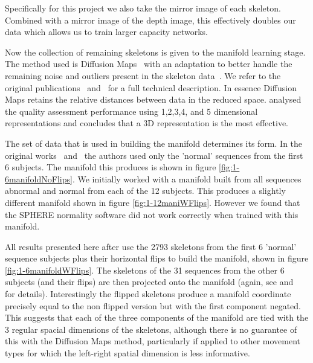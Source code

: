 \documentclass[11pt]{article} %
\begin{document}
Specifically for this project we also take the mirror image of each skeleton. Combined with a mirror image of the depth image, this effectively doubles our data which allows us to train larger capacity networks.

Now the collection of remaining skeletons is given to the manifold learning stage. The method used is Diffusion Maps~\cite{Coifman2006} with an adaptation to better handle the remaining noise and outliers present in the skeleton data~\cite{Paiement}. We refer to the original publications~\cite{Paiement} and~\cite{Tao} for a full technical description. In essence Diffusion Maps retains the relative distances between data in the reduced space. \cite{Tao} analysed the quality assessment performance using 1,2,3,4, and 5 dimensional representations and concludes that a 3D representation is the most effective.

The set of data that is used in building the manifold determines its form. In the original works~\cite{Paiement} and~\cite{Tao} the authors used only the 'normal' sequences from the first 6 subjects. The manifold this produces is shown in figure \ref{fig:1-6manifoldNoFlips}. We initially worked with a manifold built from all sequences abnormal and normal from each of the 12 subjects. This produces a slightly different manifold shown in figure \ref{fig:1-12maniWFlips}. However we found that the SPHERE normality software did not work correctly when trained with this manifold. %

All results presented here after use the 2793 skeletons from the first 6 'normal' sequence subjects plus their horizontal flips to build the manifold, shown in figure \ref{fig:1-6manifoldWFlips}. The skeletons of the 31 sequences from the other 6 subjects (and their flips) are then projected onto the manifold (again, see \cite{Paiement} and~\cite{Tao} for details). Interestingly the flipped skeletons produce a manifold coordinate precisely equal to the non flipped version but with the first component negated. This suggests that each of the three components of the manifold are tied with the 3 regular spacial dimensions of the skeletons, although there is no guarantee of this with the Diffusion Maps method, particularly if applied to other movement types for which the left-right spatial dimension is less informative. 
\end{document}
